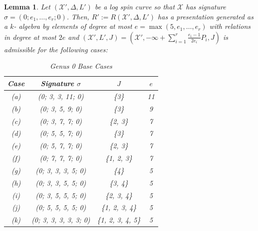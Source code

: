 \documentclass{amsart}
\theoremstyle{plain}
\newtheorem{lem}[thm]{Lemma}
\theoremstyle{definition}
\theoremstyle{remark}
\numberwithin{equation}{section}
\newcommand \sx{\mathscr X}
\newcommand \subhalf[1]{\frac{{#1} - 1}{2{#1}}}
\newcommand{\halfcan}{L}
\DeclareMathOperator{\initial}{in_\prec}
\begin{document}
\begin{lem}
\label{lem:g-0-admissible-cases}
Let $(\sx', \Delta, \halfcan')$ be a log spin curve so that $\sx$
has signature $\sigma = (0; e_1, \ldots, e_r; 0)$. Then, $R' := R(
\sx', \Delta, \halfcan')$ has a presentation generated as a $k$-
algebra by elements of degree at most $e = \max(5 , e_1, \ldots, e_r
)$ with relations in degree at most $2e$ and $(\sx ', \halfcan', J)
= (\sx ', -\infty + \sum_{i = 1}^{r} \subhalf{e_i} P_i, J)$ is
admissible for the following cases:

\begin{longtable}
	{| c || c | c | c |}
	\caption{Genus 0 Base Cases}
	\label{table:g-0-base-cases}
	
	\tabularnewline
	
	\hline
	Case & Signature $\sigma$ & $J$ & $e$\\
	\hline
	\hline

	(a) & (0; 3, 3, 11; 0) & \{3\} & 11\\	\hline

	(b) & (0; 3, 5, 9; 0) & \{3\}	& 9\\ \hline

	(c) & (0; 3, 7, 7; 0) & \{2, 3\}	& 7\\ \hline
	
	(d) & (0; 5, 5, 7; 0) & \{3\}	& 7\\ \hline
	
	(e) & (0; 5, 7, 7; 0) & \{2, 3\}	& 7\\ \hline
	
	(f) & (0; 7, 7, 7; 0) & \{1, 2, 3\}	& 7\\ \hline

	(g) & (0; 3, 3, 3, 5; 0) & \{4\} & 5\\ \hline
	
	(h) & (0; 3, 3, 5, 5; 0) & \{3, 4\} & 5\\ \hline
	
	(i) & (0; 3, 5, 5, 5; 0) & \{2, 3, 4\} & 5\\ \hline
	
	(j) & (0; 5, 5, 5, 5; 0) & \{1, 2, 3, 4\} & 5\\ \hline

	(k) &	(0; 3, 3, 3, 3, 3; 0) & \{1, 2, 3, 4, 5\} & 5\\ \hline
\end{longtable}

\end{lem}
\end{document}
